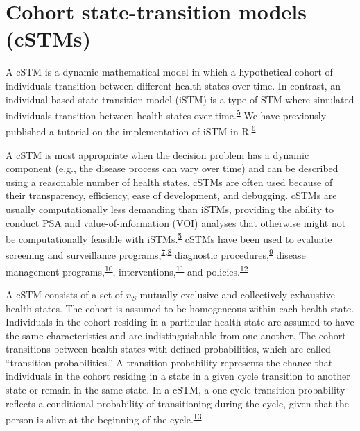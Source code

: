 \documentclass[
]{article}
\begin{document}
\hypertarget{cohort-state-transition-models-cstms}{%
\section{Cohort state-transition models (cSTMs)}\label{cohort-state-transition-models-cstms}}

A cSTM is a dynamic mathematical model in which a hypothetical cohort of individuals transition between different health states over time. In contrast, an individual-based state-transition model (iSTM) is a type of STM where simulated individuals transition between health states over time.\textsuperscript{\protect\hyperlink{ref-Siebert2012c}{5}} We have previously published a tutorial on the implementation of iSTM in R.\textsuperscript{\protect\hyperlink{ref-Krijkamp2018}{6}}

A cSTM is most appropriate when the decision problem has a dynamic component (e.g., the disease process can vary over time) and can be described using a reasonable number of health states. cSTMs are often used because of their transparency, efficiency, ease of development, and debugging. cSTMs are usually computationally less demanding than iSTMs, providing the ability to conduct PSA and value-of-information (VOI) analyses that otherwise might not be computationally feasible with iSTMs.\textsuperscript{\protect\hyperlink{ref-Siebert2012c}{5}} cSTMs have been used to evaluate screening and surveillance programs,\textsuperscript{\protect\hyperlink{ref-Suijkerbuijk2018}{7},\protect\hyperlink{ref-Sathianathen2018a}{8}} diagnostic procedures,\textsuperscript{\protect\hyperlink{ref-Lu2018b}{9}} disease management programs,\textsuperscript{\protect\hyperlink{ref-Djatche2018}{10}}, interventions,\textsuperscript{\protect\hyperlink{ref-Smith-Spangler2010}{11}} and policies.\textsuperscript{\protect\hyperlink{ref-Pershing2014}{12}}

A cSTM consists of a set of \(n_S\) mutually exclusive and collectively exhaustive health states. The cohort is assumed to be homogeneous within each health state. Individuals in the cohort residing in a particular health state are assumed to have the same characteristics and are indistinguishable from one another. The cohort transitions between health states with defined probabilities, which are called ``transition probabilities.'' A transition probability represents the chance that individuals in the cohort residing in a state in a given cycle transition to another state or remain in the same state. In a cSTM, a one-cycle transition probability reflects a conditional probability of transitioning during the cycle, given that the person is alive at the beginning of the cycle.\textsuperscript{\protect\hyperlink{ref-Miller1994}{13}}
\end{document}
